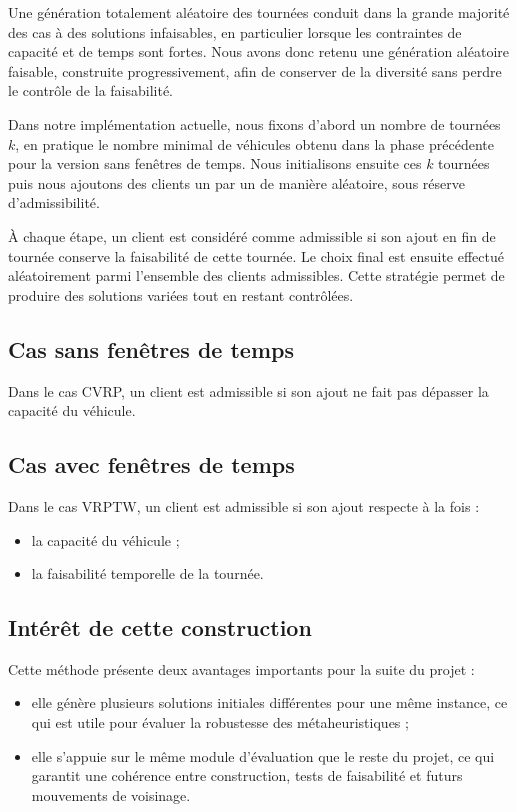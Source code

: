 \documentclass[11pt,a4paper]{article}
\begin{document}
Une génération totalement aléatoire des tournées conduit dans la grande majorité des cas à des solutions infaisables, en particulier lorsque les contraintes de capacité et de temps sont fortes. Nous avons donc retenu une génération aléatoire faisable, construite progressivement, afin de conserver de la diversité sans perdre le contrôle de la faisabilité.

Dans notre implémentation actuelle, nous fixons d'abord un nombre de tournées \(k\), en pratique le nombre minimal de véhicules obtenu dans la phase précédente pour la version sans fenêtres de temps. Nous initialisons ensuite ces \(k\) tournées puis nous ajoutons des clients un par un de manière aléatoire, sous réserve d'admissibilité.

À chaque étape, un client est considéré comme admissible si son ajout en fin de tournée conserve la faisabilité de cette tournée. Le choix final est ensuite effectué aléatoirement parmi l'ensemble des clients admissibles. Cette stratégie permet de produire des solutions variées tout en restant contrôlées.

\subsection{Cas sans fenêtres de temps}
Dans le cas CVRP, un client est admissible si son ajout ne fait pas dépasser la capacité du véhicule.

\subsection{Cas avec fenêtres de temps}
Dans le cas VRPTW, un client est admissible si son ajout respecte à la fois :
\begin{itemize}
    \item la capacité du véhicule ;
    \item la faisabilité temporelle de la tournée.
\end{itemize}

\subsection{Intérêt de cette construction}
Cette méthode présente deux avantages importants pour la suite du projet :
\begin{itemize}
    \item elle génère plusieurs solutions initiales différentes pour une même instance, ce qui est utile pour évaluer la robustesse des métaheuristiques ;
    \item elle s'appuie sur le même module d'évaluation que le reste du projet, ce qui garantit une cohérence entre construction, tests de faisabilité et futurs mouvements de voisinage.
\end{itemize}
\end{document}

